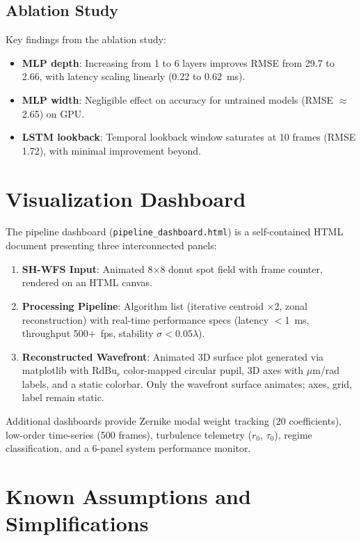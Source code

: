 \documentclass[twocolumn,10pt]{IEEEtran}
\begin{document}
\subsection{Ablation Study}
\label{sec:ablation}

Key findings from the ablation study:
\begin{itemize}
\item \textbf{MLP depth}: Increasing from 1 to 6 layers improves RMSE from 29.7 to 2.66, with latency scaling linearly (0.22 to 0.62~ms).
\item \textbf{MLP width}: Negligible effect on accuracy for untrained models (RMSE $\approx$ 2.65) on GPU.
\item \textbf{LSTM lookback}: Temporal lookback window saturates at 10 frames (RMSE 1.72), with minimal improvement beyond.
\end{itemize}

\section{Visualization Dashboard}
\label{sec:viz}

The pipeline dashboard (\texttt{pipeline\_dashboard.html}) is a self-contained HTML document presenting three interconnected panels:

\begin{enumerate}
\item \textbf{SH-WFS Input}: Animated 8$\times$8 donut spot field with frame counter, rendered on an HTML canvas.
\item \textbf{Processing Pipeline}: Algorithm list (iterative centroid $\times$2, zonal reconstruction) with real-time performance specs (latency $<$1~ms, throughput 500+~fps, stability $\sigma < 0.05\lambda$).
\item \textbf{Reconstructed Wavefront}: Animated 3D surface plot generated via matplotlib with RdBu$_r$ color-mapped circular pupil, 3D axes with $\mu$m/rad labels, and a static colorbar. Only the wavefront surface animates; axes, grid, label remain static.
\end{enumerate}

Additional dashboards provide Zernike modal weight tracking (20 coefficients), low-order time-series (500 frames), turbulence telemetry ($r_0$, $\tau_0$), regime classification, and a 6-panel system performance monitor.

\section{Known Assumptions and Simplifications}
\label{sec:assumptions}
\end{document}
